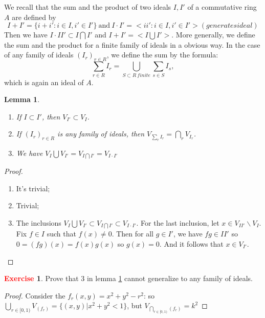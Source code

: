 \documentclass[12pt,a4paper,english]{article}
\theoremstyle{plain}
\newtheorem{lem}[thm]{Lemma}
\theoremstyle{definition}
\newtheorem{exercise}{\textbf{\textcolor{red}{Exercise}}}
\theoremstyle{remark}
\begin{document}
We recall that the sum and the product of two ideals $I, I'$ of a commutative ring $A$ are defined by 
\begin{equation*}
    I+I'=\{i+i':i\in I, i'\in I'\}\ \text{and}\ I\cdot I'=<ii': i\in I,i'\in I'>(generates ideal)
\end{equation*}
Then we have $I\cdot II'\subset I\bigcap I'$ and $I+I'=<I\bigcup I'>$. More generally, we define the sum and the product for a finite family of ideals in a obvious way. In the case of any family of ideals $(I_{r})_{r\in R}$, we define the sum by the formula:
\begin{equation*}
    \sum_{r\in R}I_{r}=\bigcup\limits_{S\subset R\ finite}\sum_{s\in S}I_{s},
\end{equation*}
which is again an ideal of $A$.
\begin{lem}\label{lem1}
\begin{enumerate}
    \item If $I\subset I'$, then $V_{I'}\subset V_{I}$.
    \item If $(I_{r})_{r\in R}$ is any family of ideals, then $V_{\sum_{r}I_{r}}=\bigcap_{r} V_{I_{r}}$.
    \item We have $V_{I}\bigcup V_{I'}=V_{I\bigcap I'}=V_{I\cdot I'}$
\end{enumerate}
\end{lem}
\begin{proof}
\begin{enumerate}
    \item It's trivial;
    \item Trivial;
    \item The inclusions $V_{I}\bigcup V_{I'}\subset V_{I\bigcap I'}\subset V_{I\cdot I'}$. For the last inclusion, let $x\in V_{II'}\backslash V_{I}$. Fix $f\in I$ such that $f(x)\not=0$. Then for all $g\in I'$, we have $fg\in II'$ so $0=(fg)(x)=f(x)g(x)$ so $g(x)=0$. And it follows that $x\in V_{I'}$.
\end{enumerate}
\end{proof}
\begin{exercise}
Prove that 3 in lemma \ref{lem1} cannot generalize to any family of ideals. 
\end{exercise}
\begin{tcolorbox}
\begin{proof}
Consider the $f_{r}(x,y)=x^{2}+y^{2}-r^{2}$:
so $\bigcup_{r\in[0,1)}V_{(f_{r})}=\{(x,y)|x^{2}+y^{2}<1\}$, but $V_{\bigcap_{r\in[0,1)}(f_{r})}=k^{2}$
\end{proof}
\end{tcolorbox}
\end{document}
